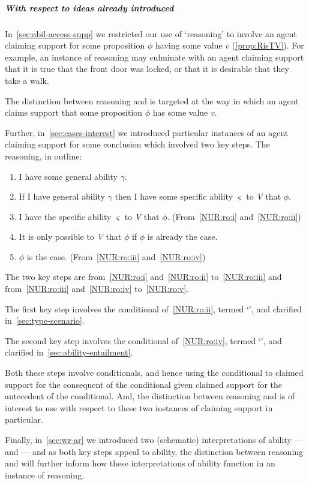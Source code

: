 \subparagraph*{With respect to ideas already introduced}

\begin{note}
  In~\autoref{sec:abil-access-supp} we restricted our use of `reasoning' to involve an agent claiming support for some proposition \(\phi\) having some value \(v\) (\autoref{prop:RisTV}).
  For example, an instance of reasoning may culminate with an agent claiming support that it is true that the front door was locked, or that it is desirable that they take a walk.

  The distinction between reasoning \ur{} and \nr{} is targeted at the way in which an agent claims support that some proposition \(\phi\) has some value \(v\).
\end{note}

\begin{note}
  Further, in~\autoref{sec:cases-interest} we introduced particular instances of an agent claiming support for some conclusion which involved two key steps.
  The reasoning, in outline:
  \begin{enumerate}[label=\arabic*., ref=(\arabic*)]
  \item\label{NUR:ro:i} I have some general ability \(\gamma\).
  \item\label{NUR:ro:ii} If I have general ability \(\gamma\) then I have some specific ability \(\varsigma\) to \emph{V} that \(\phi\).
  \item\label{NUR:ro:iii} I have the specific ability \(\varsigma\) to \emph{V} that \(\phi\). \hfill (From~\ref{NUR:ro:i} and~\ref{NUR:ro:ii})
  \item\label{NUR:ro:iv} It is only possible to \emph{V} that \(\phi\) if \(\phi\) is already the case.
  \item\label{NUR:ro:v} \(\phi\) is the case. \hfill (From~\ref{NUR:ro:iii} and~\ref{NUR:ro:iv})
  \end{enumerate}

  The two key steps are from~\ref{NUR:ro:i} and~\ref{NUR:ro:ii} to~\ref{NUR:ro:iii} and from~\ref{NUR:ro:iii} and~\ref{NUR:ro:iv} to~\ref{NUR:ro:v}.

  The first key step involves the conditional of~\ref{NUR:ro:ii}, termed `\gsi{-}', and clarified in~\autoref{sec:type-scenario}.

  The second key step involves the conditional of~\ref{NUR:ro:iv}, termed `', and clarified in~\autoref{sec:ability-entailment}.

  Both these steps involve conditionals, and hence using the conditional to claimed support for the consequent of the conditional given claimed support for the antecedent of the conditional.
  And, the distinction between reasoning \ur{} and \nr{} is of interest to use with respect to these two instances of claiming support in particular.

  Finally, in~\autoref{sec:wr-ar} we introduced two (schematic) interpretations of ability --- \AR{} and \WR{} --- and as both key steps appeal to ability, the distinction between reasoning \ur{} and \nr{} will further inform how these interpretations of ability function in an instance of reasoning.
\end{note}

